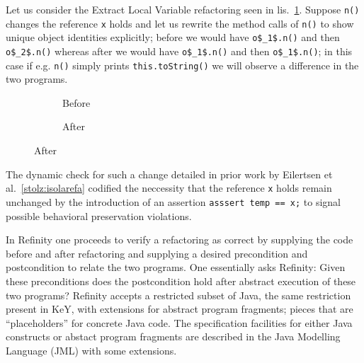 Let us consider the Extract Local Variable refactoring seen in lis.~\ref{lst:ExtractVariable-java}. Suppose \lstinline[style=smallJava]|n()|
changes the reference \lstinline[style=smallJava]|x| holds and let us rewrite the method calls of \lstinline[style=smallJava]|n()| to show unique
object identities explicitly; before we would have \lstinline[mathescape=true,style=smallJava]|o$_1$.n()| and then
\lstinline[mathescape=true,style=smallJava]|o$_2$.n()| whereas after we would have \lstinline[mathescape=true,style=smallJava]|o$_1$.n()|
and then \lstinline[mathescape=true,style=smallJava]|o$_1$.n()|; in this case if e.g. \lstinline[mathescape=true,style=smallJava]|n()|
simply prints \lstinline[mathescape=true,style=smallJava]|this.toString()| we will observe a difference in the two programs.

\begin{figure}[!h]
  \centering
  \begin{subfigure}{.2\linewidth}
    
    \caption{Before}
  \end{subfigure}\hspace{1cm}
  \begin{subfigure}{.3\linewidth}
    
    \caption{After}
  \end{subfigure}
\label{lst:ExtractVariable-java}
\end{figure}

The dynamic check for such a change detailed in prior work by Eilertsen et al.~\ref{stolz:isolarefa} codified the neccessity that the reference \lstinline[style=smallJava]|x|
holds remain unchanged by the introduction of an assertion \lstinline[style=smallJava]|asssert temp == x;| to signal possible behavioral preservation violations.

In Refinity one proceeds to verify a refactoring as correct by supplying the code before and after refactoring and supplying a desired precondition and postcondition to relate
the two programs. One essentially asks Refinity: Given these preconditions does the postcondition hold after abstract execution of these two programs? Refinity accepts a restricted
subset of Java, the same restriction present in KeY, with extensions for abstract program fragments; pieces that are ``placeholders'' for concrete Java code.
The specification facilities for either Java constructs or abstact program fragments are described in the Java Modelling Language (JML) with some extensions.

